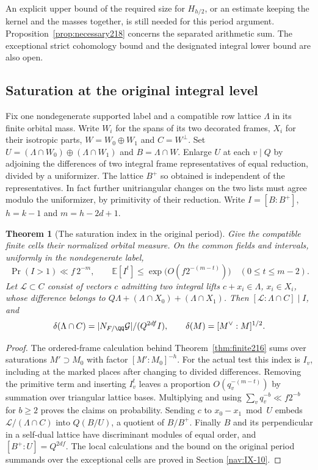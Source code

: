 \documentclass[a4paper,11pt]{article}
\newtheorem{theorem}[proposition]{Theorem}
\theoremstyle{definition}
\theoremstyle{remark}
\numberwithin{equation}{section}
\begin{document}
An explicit upper bound of the required size for \(H_{h/2}\),
or an estimate keeping the kernel and the masses together, is
still needed for this period argument. Proposition~\ref{prop:necessary218}
concerns the separated arithmetic sum. The exceptional strict
cohomology bound and the designated integral lower bound are
also open.

\subsection{Saturation at the original integral level}\label{nav:IX-25}
Fix one nondegenerate supported label and a compatible row
lattice \(\Lambda\) in its finite orbital mass. Write \(W_i\)
for the spans of its two decorated frames, \(X_i\) for their
isotropic parts, \(W=W_0\oplus W_1\) and \(C=W^\perp\).
Set \(U=(\Lambda\cap W_0)\oplus(\Lambda\cap W_1)\) and
\(B=\Lambda\cap W\). Enlarge \(U\) at each \(v\mid Q\) by
adjoining the differences of two integral frame representatives
of equal reduction, divided by a uniformizer. The lattice
\(B^+\) so obtained is independent of the representatives. In
fact further unitriangular changes on the two lists must agree
modulo the uniformizer, by primitivity of their reduction.
Write \(I=[B:B^+]\), \(h=k-1\) and \(m=h-2d+1\).

\begin{theorem}[The saturation index in the original period]
\label{thm:saturation220}
Give the compatible finite cells their normalized orbital
measure. On the common fields and intervals, uniformly in
the nondegenerate label,
\[
   \Pr(I>1)\ll f\,2^{-m},\qquad
   \mathbb E[I^t]\le \exp\bigl(O(f2^{-(m-t)})\bigr)
                                  \quad(0\le t\le m-2).
\]
Let \(\mathcal L\subset C\) consist of vectors \(c\) admitting
two integral lifts \(c+x_i\in\Lambda\), \(x_i\in X_i\), whose
difference belongs to
\(Q\Lambda+(\Lambda\cap X_0)+(\Lambda\cap X_1)\). Then
\([\mathcal L:\Lambda\cap C]\mid I\), and
\[
 \delta(\Lambda\cap C)=
             |N_{F/\QQ}\mathcal G|/(Q^{2df} I),
 \qquad \delta(M)=[M^\vee:M]^{1/2}.
\]
\end{theorem}
\begin{proof}
The ordered-frame calculation behind Theorem~\ref{thm:finite216}
sums over saturations \(M'\supset M_0\) with factor
\([M':M_0]^{-h}\). For the actual test this index is \(I_v\),
including at the marked places after changing to divided
differences. Removing the primitive term and inserting
\(I_v^t\) leaves a proportion \(O(q_v^{-(m-t)})\) by summation
over triangular lattice bases. Multiplying and using
\(\sum_v q_v^{-b}\ll f2^{-b}\) for \(b\ge2\) proves the
claims on probability. Sending \(c\) to \(x_0-x_1\bmod U\)
embeds \(\mathcal L/(\Lambda\cap C)\) into \(Q(B/U)\), a
quotient of \(B/B^+\). Finally \(B\) and its perpendicular
in a self-dual lattice have discriminant modules of equal
order, and \([B^+:U]=Q^{2df}\). The local calculations and the
bound on the original period summands over the exceptional
cells are proved in
Section \ref{nav:IX-10}.
\end{proof}
\end{document}

